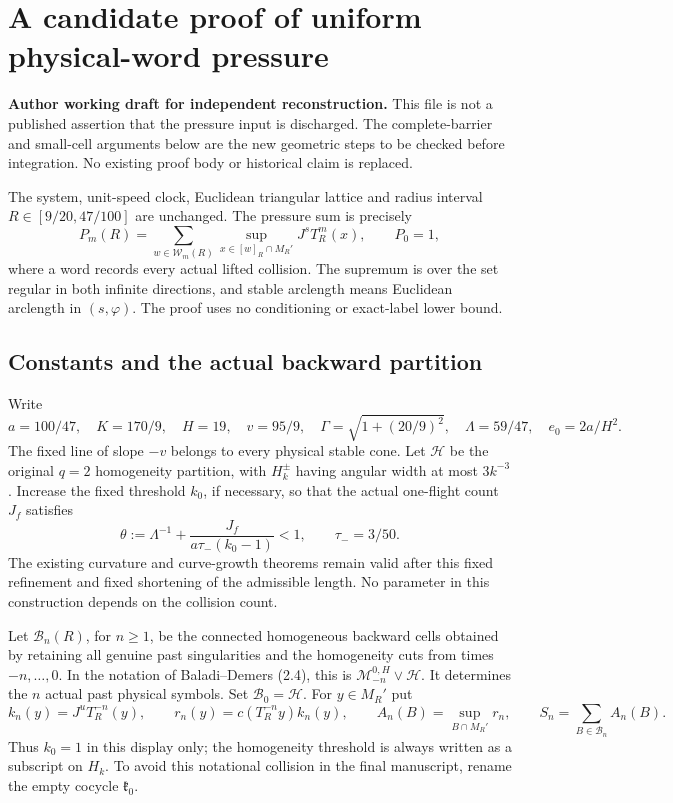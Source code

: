 \section{A candidate proof of uniform physical-word pressure}
\label{sec:wp-pressure}
\textbf{Author working draft for independent reconstruction.}
This file is not a published assertion that the pressure input is
discharged.  The complete-barrier and small-cell arguments below are the
new geometric steps to be checked before integration.  No existing
proof body or historical claim is replaced.

The system, unit-speed clock, Euclidean triangular lattice and radius
interval $R\in[9/20,47/100]$ are unchanged.  The pressure sum is precisely
\[
 P_m(R)=\sum_{w\in\mathcal W_m(R)}
       \sup_{x\in[w]_R\cap M_R'}J^sT_R^m(x),\qquad P_0=1,
\]
where a word records every actual lifted collision.  The supremum is
over the set regular in both infinite directions, and stable arclength
means Euclidean arclength in $(s,\varphi)$.
The proof uses no conditioning or exact-label lower bound.

\subsection{Constants and the actual backward partition}

Write
\[
 a=100/47,\quad K=170/9,\quad H=19,\quad
 v=95/9,\quad \Gamma=\sqrt{1+(20/9)^2},\quad
 \Lambda=59/47,\quad e_0=2a/H^2.
\]
The fixed line of slope $-v$ belongs to every physical stable cone.
Let $\mathcal H$ be the original $q=2$ homogeneity partition, with
$H_k^\pm$ having angular width at most $3k^{-3}$.
Increase the fixed threshold $k_0$, if necessary, so that the actual
one-flight count $J_f$ satisfies
\[
 \theta:=\Lambda^{-1}
       +\frac{J_f}{a\tau_-(k_0-1)}<1,\qquad \tau_-=3/50.
\]
The existing curvature and curve-growth theorems remain valid after
this fixed refinement and fixed shortening of the admissible length.
No parameter in this construction depends on the collision count.

Let $\mathcal B_n(R)$, for $n\ge1$, be the connected homogeneous
backward cells obtained by retaining all genuine past singularities
and the homogeneity cuts from times $-n,\ldots,0$.
In the notation of Baladi--Demers (2.4), this is
$\mathcal M_{-n}^{0,H}\vee\mathcal H$.
It determines the $n$ actual past physical symbols.
Set $\mathcal B_0=\mathcal H$.
For $y\in M_R'$ put
\[
 k_n(y)=J^uT_R^{-n}(y),\qquad
 r_n(y)=c(T_R^{-n}y)k_n(y),\qquad
 A_n(B)=\sup_{B\cap M_R'}r_n,\qquad
 S_n=\sum_{B\in\mathcal B_n}A_n(B).
\]
Thus $k_0=1$ in this display only; the homogeneity threshold is always
written as a subscript on $H_k$.  To avoid this notational collision
in the final manuscript, rename the empty cocycle $\mathfrak k_0$.

